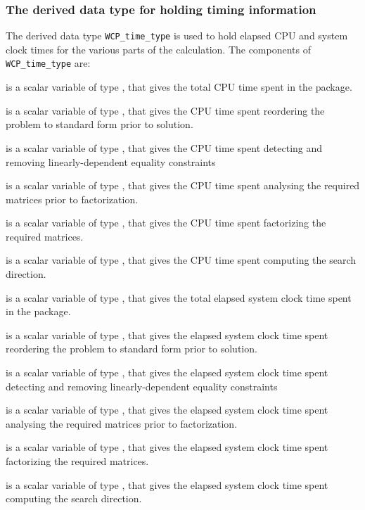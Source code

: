 \documentclass{galahad}
\newcommand{\packagename}{WCP}
\begin{document}
\subsubsection{The derived data type for holding timing 
 information}\label{typetime}
The derived data type 
{\tt \packagename\_time\_type} 
is used to hold elapsed CPU and system clock times for the various parts of 
the calculation. The components of 
{\tt \packagename\_time\_type} 
are:
\begin{description}
 is a scalar variable of type \realdp, that gives
 the total CPU time spent in the package.

 is a scalar variable of type \realdp, that gives
 the CPU time spent reordering the problem to standard form prior to solution.

 is a scalar variable of type \realdp, that gives
 the CPU time spent detecting and removing linearly-dependent equality 
constraints

 is a scalar variable of type \realdp, that gives
 the CPU time spent analysing the required matrices prior to factorization.

 is a scalar variable of type \realdp, that gives
 the CPU time spent factorizing the required matrices.

 is a scalar variable of type \realdp, that gives
 the CPU time spent computing the search direction.

 is a scalar variable of type \realdp, that gives
 the total elapsed system clock time spent in the package.

 is a scalar variable of type \realdp, that gives
 the elapsed system clock time spent reordering the problem to standard form 
prior to solution.

 is a scalar variable of type \realdp, that 
gives  the elapsed system clock time spent detecting and removing 
linearly-dependent equality 
 constraints

 is a scalar variable of type \realdp, that gives
 the elapsed system clock time spent analysing the required matrices prior to 
factorization.

 is a scalar variable of type \realdp, that gives
 the elapsed system clock time spent factorizing the required matrices.

 is a scalar variable of type \realdp, that gives
 the elapsed system clock time spent computing the search direction.

\end{description}
\end{document}
